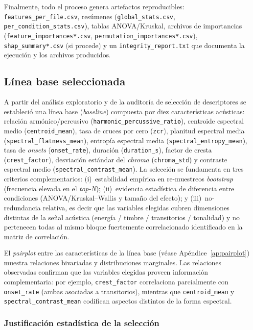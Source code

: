 \documentclass[12pt, letterpaper]{report}
\begin{document}
Finalmente, todo el proceso genera artefactos reproducibles: \texttt{features\_per\_file.csv}, resúmenes (\texttt{global\_stats.csv}, \texttt{per\_condition\_stats.csv}), tablas ANOVA/Kruskal, archivos de importancias (\texttt{feature\_importances*.csv}, \texttt{permutation\_importances*.csv}), \texttt{shap\_summary*.csv} (si procede) y un \texttt{integrity\_report.txt} que documenta la ejecución y los archivos producidos.

\subsection{Línea base seleccionada}

A partir del análisis exploratorio y de la auditoría de selección de descriptores se estableció una línea base (\textit{baseline}) compuesta por diez características acústicas: relación armónico/percusivo (\texttt{harmonic\_percussive\_ratio}), centroide espectral medio (\texttt{centroid\_mean}), tasa de cruces por cero (\texttt{zcr}), planitud espectral media (\texttt{spectral\_flatness\_mean}), entropía espectral media (\texttt{spectral\_entropy\_mean}), tasa de \textit{onsets} (\texttt{onset\_rate}), duración (\texttt{duration\_s}), factor de cresta (\texttt{crest\_factor}), desviación estándar del \textit{chroma} (\texttt{chroma\_std}) y contraste espectral medio (\texttt{spectral\_contrast\_mean}). La selección se fundamenta en tres criterios complementarios: (i)~estabilidad empírica en re-muestreos \textit{bootstrap} (frecuencia elevada en el \textit{top-N}); (ii)~evidencia estadística de diferencia entre condiciones (ANOVA/Kruskal--Wallis y tamaño del efecto); y (iii)~no-redundancia relativa, es decir que las variables elegidas cubren dimensiones distintas de la señal acústica (energía / timbre / transitorios / tonalidad) y no pertenecen todas al mismo bloque fuertemente correlacionado identificado en la matriz de correlación.

El \textit{pairplot} entre las características de la línea base (véase Apéndice~\ref{ap:pairplot}) muestra relaciones bivariadas y distribuciones marginales. Las relaciones observadas confirman que las variables elegidas proveen información complementaria: por ejemplo, \texttt{crest\_factor} correlaciona parcialmente con \texttt{onset\_rate} (ambas asociadas a transitorios), mientras que \texttt{centroid\_mean} y \texttt{spectral\_contrast\_mean} codifican aspectos distintos de la forma espectral.

\subsubsection{Justificación estadística de la selección}
\end{document}
